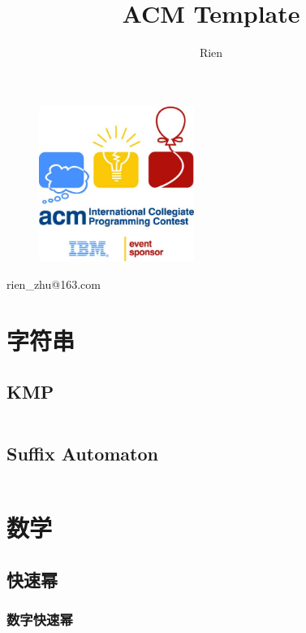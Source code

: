 \documentclass[a4paper,11pt]{article}
\author{Rien}
\title{ACM Template}
\begin{document}
\maketitle %

\begin{figure}[H]
    \centering
    \includegraphics[width=0.45\textwidth,]{picture/logo.jpg}
    \vspace{0.5cm}
\end{figure}
\centerline{rien\_zhu@163.com}

\newpage %
\tableofcontents %
\newpage
\section{字符串}
\subsection{KMP}
\inputminted[breaklines,linenos,frame=leftline]{c++}{string/kmp.cc}

\subsection{Suffix Automaton}
\inputminted[breaklines]{c++}{string/suffix-automaton.cc}

\newpage
\section{数学}
\subsection{快速幂}
\subsubsection{数字快速幂}
\inputminted[breaklines,linenos,frame=leftline]{c++}{math/quickpow1.cpp}
\end{document}
